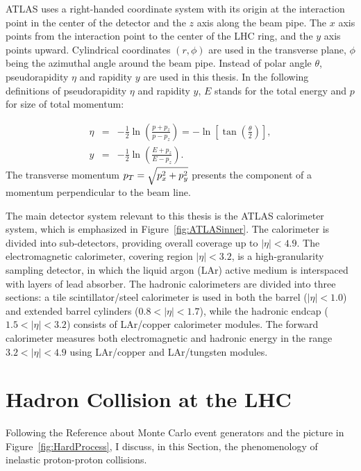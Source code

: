 ATLAS uses a right-handed coordinate system with its origin at the interaction
point in the center of the detector and the $z$ axis along the beam pipe. The
$x$ axis points from the interaction point to the center of the LHC ring, and
the $y$ axis points upward. Cylindrical coordinates $(r, \phi)$ are used in the
transverse plane, $\phi$ being the azimuthal angle around the beam pipe. Instead
of polar angle $\theta$, pseudorapidity $\eta$ and rapidity $y$ are used in this
thesis.  In the following definitions of pseudorapidity $\eta$ and rapidity $y$,
$E$ stands for the total energy and $p$ for size of total momentum: 

\begin{eqnarray}
  \eta &= & - \frac{1}{2} \ln \left( \frac{p+p_z}{p-p_z} \right) = - \ln \left[
  \tan \left( \frac{\theta}{2} \right) \right], \\ y &= &- \frac{1}{2} \ln
  \left( \frac{E+p_z}{E-p_z} \right).	
\end{eqnarray}
The transverse momentum $p_{T} = \sqrt{p_x^2 + p_y^2}$ presents the component of a
momentum perpendicular to the beam line.  

The main detector system relevant to this thesis is the ATLAS calorimeter system,
which is emphasized in Figure~\ref{fig:ATLASinner}. The calorimeter is divided
into sub-detectors, providing overall coverage up to $|\eta| < 4.9$. The
electromagnetic calorimeter, covering region $|\eta| < 3.2$, is a
high-granularity sampling detector, in which the liquid argon (LAr) active medium
is interspaced with layers of lead absorber. The hadronic calorimeters are
divided into three sections: a tile scintillator/steel calorimeter is used in
both the barrel ($|\eta| < 1.0$) and extended barrel cylinders ($0.8 < |\eta| <
1.7$), while the hadronic endcap ($1.5 < |\eta| < 3.2$) consists of LAr/copper
calorimeter modules. The forward calorimeter measures both electromagnetic and
hadronic energy in the range $3.2 < |\eta| < 4.9$ using LAr/copper and
LAr/tungsten modules. 

\section{Hadron Collision at the LHC}

Following the Reference about Monte Carlo event generators \cite{PDG} and the
picture in Figure~\ref{fig:HardProcess}, I discuss, in this Section, the
phenomenology of inelastic proton-proton collisions. 

